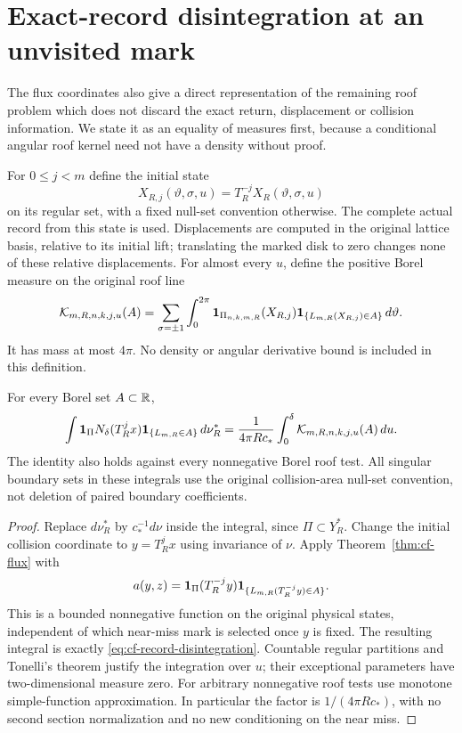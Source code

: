 \section{Exact-record disintegration at an unvisited mark}
\label{sec:cf-record}
The flux coordinates also give a direct representation of the
remaining roof problem which does not discard the exact return,
displacement or collision information. We state it as an equality
of measures first, because a conditional angular roof kernel need
not have a density without proof.

For $0\le j<m$ define the initial state
\[
 X_{R,j}(\vartheta,\sigma,u)=T_R^{-j}X_R(\vartheta,\sigma,u)
\]
on its regular set, with a fixed null-set convention otherwise.
The complete actual record from this state is used. Displacements
are computed in the original lattice basis, relative to its initial
lift; translating the marked disk to zero changes none of these
relative displacements. For almost every $u$, define the positive
Borel measure on the original roof line
\begin{equation}\label{eq:cf-kernel}
 \mathcal K_{m,R,n,k,j,u}(A)=\sum_{\sigma=\pm1}
  \int_0^{2\pi}\mathbf1_{\Pi_{n,k,m,R}}(X_{R,j})
             \mathbf1_{\{L_{m,R}(X_{R,j})\in A\}}\,d\vartheta.
\end{equation}
It has mass at most $4\pi$. No density or angular derivative bound
is included in this definition.

\begin{theorem}
\label{thm:cf-record}
For every Borel set $A\subset\mathbb R$,
\begin{equation}\label{eq:cf-record-disintegration}
 \int\mathbf1_\Pi N_\delta(T_R^jx)
                 \mathbf1_{\{L_{m,R}\in A\}}\,d\nu_R^*
   =\frac{1}{4\pi R c_*}\int_0^\delta
                       \mathcal K_{m,R,n,k,j,u}(A)\,du.
\end{equation}
The identity also holds against every nonnegative Borel roof test.
All singular boundary sets in these integrals use the original
collision-area null-set convention, not deletion of paired boundary
coefficients.
\end{theorem}
\begin{proof}
Replace $d\nu_R^*$ by $c_*^{-1}d\nu$ inside the integral, since
$\Pi\subset Y_R^*$. Change the initial collision coordinate to
$y=T_R^jx$ using invariance of $\nu$. Apply
Theorem~\ref{thm:cf-flux} with
\[
 a(y,z)=\mathbf1_\Pi(T_R^{-j}y)
               \mathbf1_{\{L_{m,R}(T_R^{-j}y)\in A\}}.
\]
This is a bounded nonnegative function on the original physical
states, independent of which near-miss mark is selected once $y$
is fixed. The resulting integral is exactly
\eqref{eq:cf-record-disintegration}. Countable regular partitions and
Tonelli's theorem justify the integration over $u$; their exceptional
parameters have two-dimensional measure zero. For arbitrary
nonnegative roof tests use monotone simple-function approximation.
In particular the factor is $1/(4\pi R c_*)$, with no second
section normalization and no new conditioning on the near miss.
\end{proof}

